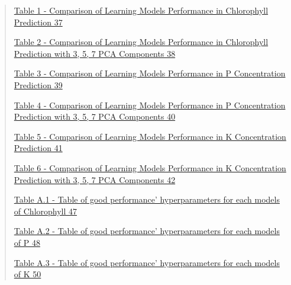 \documentclass[
]{article}
\begin{document}
\begin{quote}
\protect\hyperlink{table-1---comparison-of-learning-models-performance-in-chlorophyll-prediction}{Table
1 - Comparison of Learning Models Performance in Chlorophyll Prediction
37}

\protect\hyperlink{table-2---comparison-of-learning-models-performance-in-chlorophyll-prediction-with-3-5-7-pca-components}{Table
2 - Comparison of Learning Models Performance in Chlorophyll Prediction
with 3, 5, 7 PCA Components 38}

\protect\hyperlink{table-3---comparison-of-learning-models-performance-in-p-concentration-prediction}{Table
3 - Comparison of Learning Models Performance in P Concentration
Prediction 39}

\protect\hyperlink{table-4---comparison-of-learning-models-performance-in-p-concentration-prediction-with-3-5-7-pca-components}{Table
4 - Comparison of Learning Models Performance in P Concentration
Prediction with 3, 5, 7 PCA Components 40}

\protect\hyperlink{table-5---comparison-of-learning-models-performance-in-k-concentration-prediction}{Table
5 - Comparison of Learning Models Performance in K Concentration
Prediction 41}

\protect\hyperlink{table-6---comparison-of-learning-models-performance-in-k-concentration-prediction-with-3-5-7-pca-components}{Table
6 - Comparison of Learning Models Performance in K Concentration
Prediction with 3, 5, 7 PCA Components 42}

\protect\hyperlink{table-a.1---table-of-good-performance-hyperparameters-for-each-models-of-chlorophyll}{Table
A.1 - Table of good performance' hyperparameters for each models of
Chlorophyll 47}

\protect\hyperlink{table-a.2---table-of-good-performance-hyperparameters-for-each-models-of-p}{Table
A.2 - Table of good performance' hyperparameters for each models of P
48}

\protect\hyperlink{table-a.3---table-of-good-performance-hyperparameters-for-each-models-of-k}{Table
A.3 - Table of good performance' hyperparameters for each models of K
50}
\end{quote}

\hypertarget{section-2}{%
\subsection{}\label{section-2}}

\hypertarget{section-3}{%
\subsection{}\label{section-3}}
\end{document}
